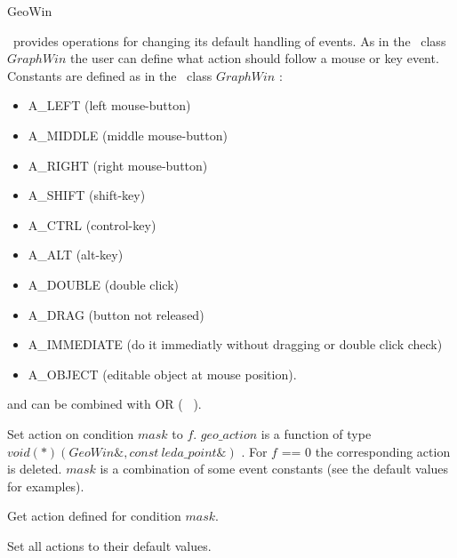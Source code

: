 \begin{ccRefClass}{GeoWin}
\begin{ccAdvanced}
\ccVar\ provides operations for changing its default handling
of events. 
As in the \leda\ class $GraphWin$ the user can define what 
action should follow a mouse or key event. Constants are defined as in the
\leda\ class $GraphWin$ : 
   \begin{itemize}
   \item  A\_LEFT  (left mouse-button)
   \item  A\_MIDDLE (middle mouse-button)
   \item  A\_RIGHT (right mouse-button)
   \item  A\_SHIFT (shift-key)
   \item  A\_CTRL (control-key)
   \item  A\_ALT (alt-key)
   \item  A\_DOUBLE (double click)
   \item  A\_DRAG (button not released)
   \item  A\_IMMEDIATE (do it immediatly without dragging or double click 
   check)
   \item  A\_OBJECT (editable object at mouse position).
   \end{itemize}
and can be combined with OR ( \vline\ ).
  

{Set action on condition $mask$ to $f$. $geo\_action$ is a
function of type $void (*)(GeoWin\&, const \ leda\_point\&)$ . 
For $f$ == $0$ the corresponding action is deleted. 
$mask$ is a combination of some event constants (see the default values for examples).
}
  
{Get action defined for condition $mask$.  }
  
{Set all actions to their default values. }


\end{ccAdvanced}
\end{ccRefClass}
